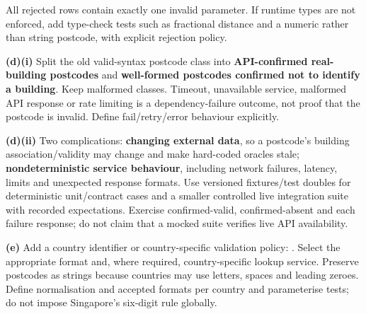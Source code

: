 \begin{studycolumns}
\vspace{0pt}

All rejected rows contain exactly one invalid parameter. If runtime types are not enforced, add type-check tests such as fractional distance and a numeric rather than string postcode, with explicit rejection policy.

\textbf{(d)(i)} Split the old valid-syntax postcode class into \textbf{API-confirmed real-building postcodes} and \textbf{well-formed postcodes confirmed not to identify a building}. Keep malformed classes. Timeout, unavailable service, malformed API response or rate limiting is a dependency-failure outcome, not proof that the postcode is invalid. Define fail/\allowbreak{}retry/\allowbreak{}error behaviour explicitly.

\textbf{(d)(ii)} Two complications: \textbf{changing external data}, so a postcode's building association/\allowbreak{}validity may change and make hard-coded oracles stale; \textbf{nondeterministic service behaviour}, including network failures, latency, limits and unexpected response formats. Use versioned fixtures/\allowbreak{}test doubles for deterministic unit/\allowbreak{}contract cases and a smaller controlled live integration suite with recorded expectations. Exercise confirmed-valid, confirmed-absent and each failure response; do not claim that a mocked suite verifies live API availability.

\textbf{(e)} Add a country identifier or country-specific validation policy: . Select the appropriate format and, where required, country-specific lookup service. Preserve postcodes as strings because countries may use letters, spaces and leading zeroes. Define normalisation and accepted formats per country and parameterise tests; do not impose Singapore's six-digit rule globally.
\end{studycolumns}
